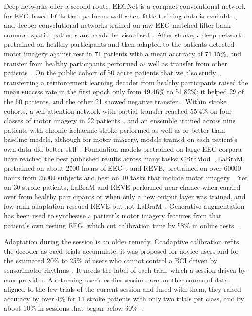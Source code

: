 \documentclass[pdflatex,sn-mathphys-num]{sn-jnl}
\begin{document}
Deep networks offer a second route. EEGNet is a compact convolutional network for EEG based BCIs that performs well when little training data is available~\cite{lawhern2018}, and deeper convolutional networks trained on raw EEG matched filter bank common spatial patterns and could be visualised~\cite{schirrmeister2017}. After stroke, a deep network pretrained on healthy participants and then adapted to the patients detected motor imagery against rest in 71 patients with a mean accuracy of 71.15\%, and transfer from healthy participants performed as well as transfer from other patients~\cite{nagarajan2024}. On the public cohort of 50 acute patients that we also study~\cite{liu2024}, transferring a reinforcement learning decoder from healthy participants raised the mean success rate in the first epoch only from 49.46\% to 51.82\%; it helped 29 of the 50 patients, and the other 21 showed negative transfer~\cite{via2026}. Within stroke cohorts, a self attention network with partial transfer reached 55.4\% on four classes of motor imagery in 22 patients~\cite{ma2024}, and an ensemble trained across nine patients with chronic ischaemic stroke performed as well as or better than baseline models, although for motor imagery, models trained on each patient's own data did better still~\cite{lee2024ensemble}. Foundation models pretrained on large EEG corpora have reached the best published results across many tasks: CBraMod~\cite{wang2025cbramod}, LaBraM, pretrained on about 2500 hours of EEG~\cite{jiang2024labram}, and REVE, pretrained on over 60000 hours from 25000 subjects and best on 10 tasks that include motor imagery~\cite{elouahidi2025reve}. Yet on 30 stroke patients, LaBraM and REVE performed near chance when carried over from healthy participants or when only a new output layer was trained, and low rank adaptation rescued REVE but not LaBraM~\cite{nguyen2026}. Generative augmentation has been used to synthesise a patient's motor imagery features from that patient's own resting EEG, which cut calibration time by 58\% in online tests~\cite{xu2026}.

Adaptation during the session is an older remedy. Coadaptive calibration refits the decoder as cued trials accumulate; it was proposed for novice users and for the estimated 20\% to 25\% of users who cannot control a BCI driven by sensorimotor rhythms~\cite{vidaurre2011}. It needs the label of each trial, which a session driven by cues provides. A returning user's earlier sessions are another source of data: aligned to the few trials of the current session and fused with them, they raised accuracy by over 4\% for 11 stroke patients with only two trials per class, and by about 10\% in sessions that began below 60\%~\cite{giles2022}.
\end{document}
